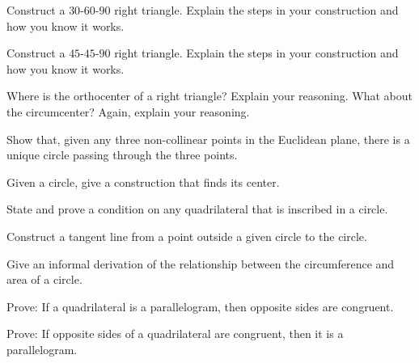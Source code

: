
\begin{prob}
Construct a $30$-$60$-$90$ right triangle. Explain the steps in your
  construction and how you know it works.
\end{prob}

\begin{prob}
Construct a $45$-$45$-$90$ right triangle. Explain the steps in your
  construction and how you know it works.
\end{prob}

\begin{prob}
Where is the orthocenter of a right triangle?  Explain your reasoning.  What about the circumcenter?  Again, explain your reasoning. 
\end{prob}

\begin{prob}
Show that, given any three non-collinear points in the Euclidean plane, there is a unique circle passing through the three points.
\end{prob}

\begin{prob}
Given a circle, give a construction that finds its center.
\end{prob}

\begin{prob}
State and prove a condition on any quadrilateral that is inscribed in a circle.  
\end{prob}

\begin{prob}
Construct a tangent line from a point outside a given circle to the circle.
\end{prob}

\begin{prob}
Give an informal derivation of the relationship between the circumference and area of a circle. 
\end{prob}

\begin{prob}
Prove:  If a quadrilateral is a parallelogram, then opposite sides are congruent.
\end{prob}

\begin{prob}
Prove:  If opposite sides of a quadrilateral are congruent, then it is a parallelogram.
\end{prob}

